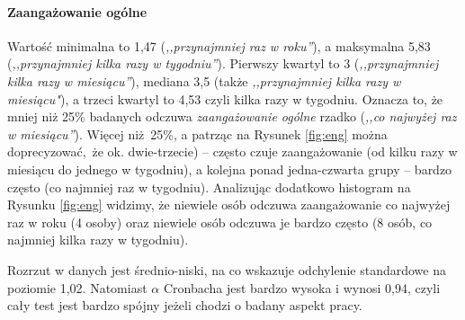 \paragraph{Zaangażowanie ogólne} Wartość minimalna to 1,47 (\textit{,,przynajmniej raz w roku''}), a maksymalna 5,83 (\textit{,,przynajmniej kilka razy w tygodniu''}). Pierwszy kwartyl to 3 (\textit{,,przynajmniej kilka razy w miesiącu''}), mediana 3,5 (także \textit{,,przynajmniej kilka razy w miesiącu"}), a trzeci kwartyl to 4,53 czyli kilka razy w tygodniu. Oznacza to, że mniej niż 25\% badanych odczuwa \textit{zaangażowanie ogólne} rzadko (\textit{,,co najwyżej raz w
miesiącu''}). Więcej niż 25\%, a patrząc na Rysunek \ref{fig:eng} można
doprecyzować, że ok. dwie-trzecie) -- często czuje zaangażowanie
(od kilku razy w miesiącu do jednego w tygodniu), a kolejna ponad jedna-czwarta grupy -- bardzo często (co najmniej raz w tygodniu). Analizując dodatkowo histogram na Rysunku \ref{fig:eng} widzimy, że niewiele osób odczuwa zaangażowanie co najwyżej raz w roku (4 osoby) oraz niewiele osób odczuwa je bardzo często (8 osób, co najmniej kilka razy w tygodniu).

Rozrzut w danych jest średnio-niski, na co wskazuje odchylenie standardowe na poziomie 1,02. Natomiast $\alpha$ Cronbacha jest bardzo wysoka i wynosi 0,94, czyli cały test jest bardzo spójny jeżeli chodzi o badany aspekt pracy.


